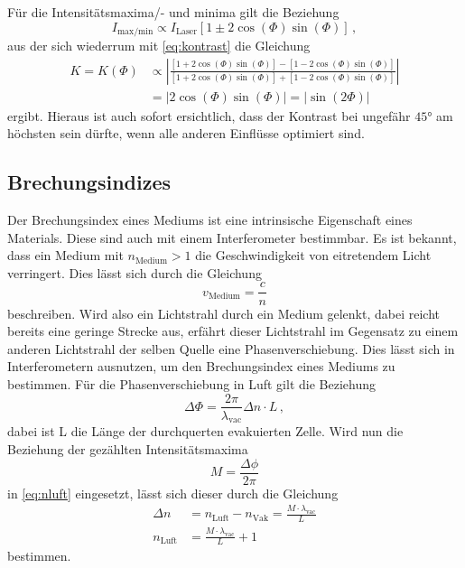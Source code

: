 Für die Intensitätsmaxima/- und minima gilt die Beziehung \cite{v64}
\begin{equation*}
    I_\text{max/min} \propto I_\text{Laser} \left[ 1 \pm 2 \cos(\Phi) \sin (\Phi) \right] \, ,
\end{equation*}
aus der sich wiederrum mit \autoref{eq:kontrast} die Gleichung
\begin{align}\label{eq:kontrast2}
    K = K(\Phi) &\propto \left|\frac{\left[ 1 + 2 \cos(\Phi) \sin (\Phi) \right] - \left[ 1 - 2 \cos(\Phi) \sin (\Phi) \right]}{\left[ 1 + 2 \cos(\Phi) \sin (\Phi) \right] + \left[ 1 - 2 \cos(\Phi) \sin (\Phi) \right]}\right| \\
    &= \left|2 \cos(\Phi) \sin(\Phi) \right| = \left| \sin (2 \Phi) \right|
\end{align}
ergibt. Hieraus ist auch sofort ersichtlich, dass der Kontrast bei ungefähr $45°$ am höchsten sein dürfte, wenn alle anderen Einflüsse optimiert sind.

\subsection{Brechungsindizes} \label{sec:n}

Der Brechungsindex eines Mediums ist eine intrinsische Eigenschaft eines Materials.
Diese sind auch mit einem Interferometer bestimmbar.
Es ist bekannt, dass ein Medium mit $n_\text{Medium} > 1$ die Geschwindigkeit von eitretendem Licht verringert.
Dies lässt sich durch die Gleichung
\begin{equation*}
    v_\text{Medium} = \frac{c}{n}
\end{equation*}
beschreiben. Wird also ein Lichtstrahl durch ein Medium gelenkt, 
dabei reicht bereits eine geringe Strecke aus, 
erfährt dieser Lichtstrahl im Gegensatz zu einem anderen Lichtstrahl der selben Quelle eine Phasenverschiebung.
Dies lässt sich in Interferometern ausnutzen, um den Brechungsindex eines Mediums zu bestimmen.
Für die Phasenverschiebung in Luft gilt die Beziehung \cite{v64}
\begin{equation} \label{eq:nluft}
    \Delta \Phi = \frac{2 \pi}{\lambda_\text{vac}} \Delta n \cdot L \, ,
\end{equation}
dabei ist L die Länge der durchquerten evakuierten Zelle.
Wird nun die Beziehung der gezählten Intensitätsmaxima 
\begin{equation} \label{eq:maxima}
    M = \frac{\Delta \phi}{2 \pi}
  \end{equation}
in \autoref{eq:nluft} eingesetzt, lässt sich dieser durch die Gleichung
\begin{align} \label{eq:nluft2}
    \Delta n &= n_\text{Luft} - n_\text{Vak} = \frac{M \cdot \lambda_\text{vac}}{L} \\
    n_\text{Luft} &= \frac{M \cdot \lambda_\text{vac}}{L} + 1
\end{align}
bestimmen.

